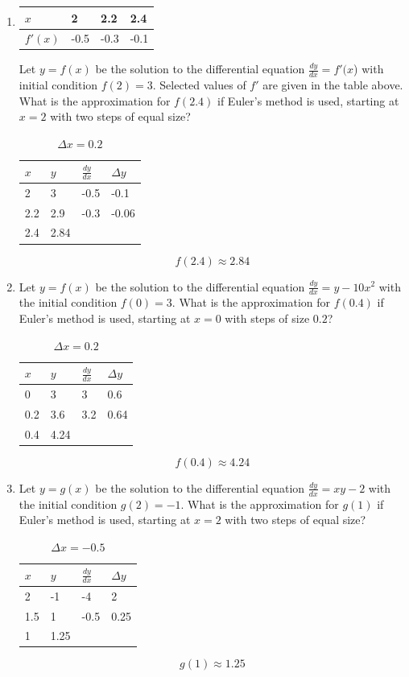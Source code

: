 \documentclass[12pt]{article}
\begin{document}
\begin{enumerate}
\item 
\begin{table}[h!]
\centering
\begin{tabular}{l|lll}
$x$     & 2    & 2.2  & 2.4  \\ \hline
$f'(x)$ & -0.5 & -0.3 & -0.1
\end{tabular}
\end{table}
Let $y = f(x)$ be the solution to the differential equation $\frac{dy}{dx}=f'(x$) with initial condition $f(2) = 3$. Selected values of $f'$ are given in the table above. What is the approximation for $f(2.4)$ if Euler’s method is used, starting at $x = 2$ with two steps of equal size?
\begin{table}[H]
\caption{$\Delta x = 0.2$}
\centering \label{table_example}
\begin{tabular}{l|lll}
$x$ & \multicolumn{1}{l|}{$y$} & \multicolumn{1}{l|}{$\frac{dy}{dx}$} & $\Delta y$ \\ \hline
2 & 3 & -0.5 & -0.1 \\
2.2 & 2.9 & -0.3 & -0.06 \\
2.4 & 2.84 &  & 
\end{tabular}
\end{table}
$$\boxed{f(2.4)\approx 2.84}$$

\item Let $y=f(x)$ be the solution to the differential equation $\frac{dy}{dx}=y-10x^2$ with the initial condition $f(0)=3$. What is the approximation for $f(0.4)$ if Euler’s method is used, starting at $x=0$ with steps of size $0.2$?

\begin{table}[H]
\caption{$\Delta x = 0.2$}
\centering \label{table_example}
\begin{tabular}{l|lll}
$x$ & \multicolumn{1}{l|}{$y$} & \multicolumn{1}{l|}{$\frac{dy}{dx}$} & $\Delta y$ \\ \hline
0 & 3 & 3 & 0.6 \\
0.2 & 3.6 & 3.2 & 0.64 \\
0.4 & 4.24 &  & 
\end{tabular}
\end{table}
$$\boxed{f(0.4)\approx 4.24}$$

\item Let $y=g(x)$ be the solution to the differential equation $\frac{dy}{dx}=xy-2$ with the initial condition $g(2)=-1$. What is the approximation for $g(1)$ if Euler’s method is used, starting at $x=2$ with two steps of equal size?
\begin{table}[H]
\caption{$\Delta x = -0.5$}
\centering \label{table_example}
\begin{tabular}{l|lll}
$x$ & \multicolumn{1}{l|}{$y$} & \multicolumn{1}{l|}{$\frac{dy}{dx}$} & $\Delta y$ \\ \hline
2 & -1 & -4 & 2 \\
1.5 & 1 & -0.5 & 0.25 \\
1 & 1.25 &  & 
\end{tabular}
\end{table}
$$\boxed{g(1)\approx 1.25}$$



\end{enumerate}
\end{document}
